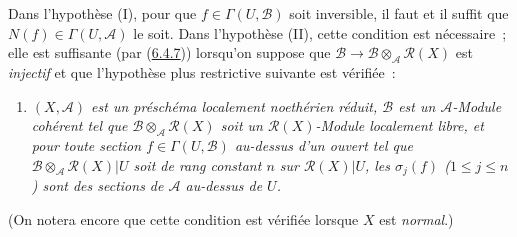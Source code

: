 \begin{env}[6.5.1]
Dans l'hypothèse (I), pour que $f\in\Gamma(U,\mathcal{B})$ soit inversible,
il faut et il suffit que $N(f)\in\Gamma(U,\mathcal{A})$ le soit. Dans
l'hypothèse (II), cette condition est nécessaire~; elle est suffisante (par
(\hyperref[II.6.4.7-fr]{6.4.7})) lorsqu'on suppose que
$\mathcal{B}\to\mathcal{B}\otimes_{\mathcal{A}}\mathcal{R}(X)$ est
\emph{injectif} et que l'hypothèse plus restrictive suivante est vérifiée~:
\begin{enumerate}
\item[(II \emph{bis})] \emph{$(X,\mathcal{A})$ est un préschéma localement
noethérien réduit, $\mathcal{B}$ est un $\mathcal{A}$-Module cohérent tel que
$\mathcal{B}\otimes_{\mathcal{A}}\mathcal{R}(X)$ soit un
$\mathcal{R}(X)$-Module localement libre, et pour toute section
$f\in\Gamma(U,\mathcal{B})$ au-dessus d'un ouvert tel que
$\mathcal{B}\otimes_{\mathcal{A}}\mathcal{R}(X)|U$ soit de rang constant $n$
sur $\mathcal{R}(X)|U$, les $\sigma_j(f)$ ($1\leq j\leq n$) sont des sections
de $\mathcal{A}$ au-dessus de $U$.}
\end{enumerate}

(On notera encore que cette condition est vérifiée lorsque $X$ est
\emph{normal}.)
\end{env}

